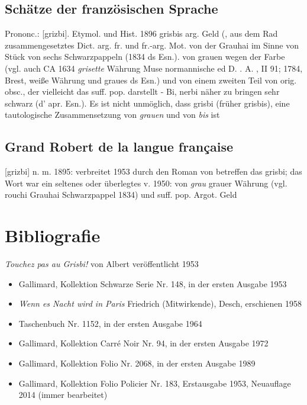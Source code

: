 \subsection*{Schätze der französischen Sprache}
Prononc.: [grizbi]. Etymol. und Hist. 1896 grisbis arg. \glqq{}Geld\grqq{} (, aus dem Rad zusammengesetztes Dict. arg. fr. und fr.-arg. Mot. von der Grauhai im Sinne von \glqq{}Stück von sechs Schwarzpappeln\grqq{} (1834 ds Esn.). von grauen wegen der Farbe (vgl. auch CA 1634 \emph{grisette} \glqq{}Währung\grqq{} Muse normannische ed D. . A. , II 91; 1784, Brest, weiße Währung und graues ds Esn.) und von einem zweiten Teil von orig. obsc., der vielleicht das suff. pop. darstellt - Bi, nerbi näher zu bringen \glqq{}sehr schwarz\grqq{} (d' apr. Esn.). Es ist nicht unmöglich, dass grisbi (früher grisbis), eine tautologische Zusammensetzung von \emph{grauen} und von \emph{bis} ist

\subsection*{Grand Robert de la langue française}
[grizbi] n. m. 1895: verbreitet 1953 durch den Roman von  betreffen das grisbi; das Wort war ein seltenes oder überlegtes v. 1950: von \emph{grau} \glqq{}grauer Währung\grqq{} (vgl. rouchi Grauhai \glqq{}Schwarzpappel\grqq{} 1834) und suff. pop. Argot. Geld


\section{Bibliografie\label{preamble-biblio}}

\emph{Touchez pas au Grisbi!} von Albert  veröffentlicht 1953

\begin{itemize}
	\item Gallimard, Kollektion Schwarze Serie Nr. 148, in der ersten Ausgabe 1953
	\item \emph{Wenn es Nacht wird in Paris} Friedrich  (Mitwirkende), Desch, erschienen 1958
	\item Taschenbuch Nr. 1152, in der ersten Ausgabe 1964
	\item Gallimard, Kollektion Carré Noir Nr. 94, in der ersten Ausgabe 1972
	\item Gallimard, Kollektion Folio Nr. 2068, in der ersten Ausgabe 1989
	\item Gallimard, Kollektion Folio Policier Nr. 183, Erstausgabe 1953, Neuauflage 2014 (immer bearbeitet)
\end{itemize}

